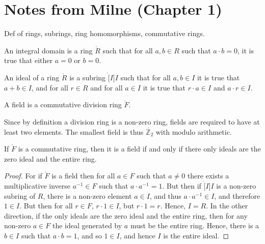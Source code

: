 \documentclass{article}                                                        %
\begin{document}
    \section{Notes from Milne (Chapter 1)}
        Def of rings, subrings, ring homomorphisms, commutative rings.
        \begin{definition}
            An integral domain is a ring $\ring{R}$ such that for all
            $a,b\in{R}$ such that $a\cdot{b}=0$, it is true that either $a=0$ or
            $b=0$.
        \end{definition}
        \begin{definition}
            An ideal of a ring $\ring{R}$ is a subring $\ring[I]{I}$ such that
            for all $a,b\in{I}$ it is true that $a+b\in{I}$, and for all
            $r\in{R}$ and for all $a\in{I}$ it is true that $r\cdot{a}\in{I}$
            and $a\cdot{r}\in{I}$.
        \end{definition}
        \begin{definition}
            A field is a commutative division ring $\ring{F}$.
        \end{definition}
        \begin{example}
            Since by definition a division ring is a non-zero ring, fields are
            required to have at least two elements. The smallest field is thus
            $\ring{\mathbb{Z}_{2}}$ with modulo arithmetic.
        \end{example}
        \begin{theorem}
            If $\ring{F}$ is a commutative ring, then it is a field if and only
            if there only ideals are the zero ideal and the entire ring.
        \end{theorem}
        \begin{proof}
            For if $\ring{F}$ is a field then for all $a\in{F}$ such that
            $a\ne{0}$ there exists a multiplicative inverse
            $a^{\minus{1}}\in{F}$ such that $a\cdot{a}^{\minus{1}}=1$. But then
            if $\ring[I]{I}$ is a non-zero subring of $R$, there is a non-zero
            element $a\in{I}$, and thus $a\cdot{a}^{\minus{1}}\in{I}$, and
            therefore $1\in{I}$. But then for all $r\in{F}$, $r\cdot{1}\in{I}$,
            but $r\cdot{1}=r$. Hence, $I=R$. In the other direction, if
            the only ideals are the zero ideal and the entire ring, then for
            any non-zero $a\in{F}$ the ideal generated by $a$ must be the entire
            ring. Hence, there is a $b\in{I}$ such that $a\cdot{b}=1$, and so
            $1\in{I}$, and hence $I$ is the entire ideal.
        \end{proof}
\end{document}
